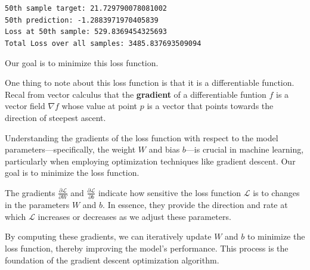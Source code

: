 
\texttt{50th sample target: 21.729790078081002 \\
50th prediction: -1.2883971970405839 \\
Loss at 50th sample: 529.8369454325693 \\
Total Loss over all samples: 3485.837693509094 
}

Our goal is to minimize this loss function. 

One thing to note about this loss function is that it is a differentiable function. Recal from vector calculus that the \textbf{gradient} of a differentiable funtion $f$ is a vector field $\nabla f$ whose value at point $p$ is a vector that points towards the direction of steepest ascent. 

Understanding the gradients of the loss function with respect to the model parameters—specifically, the weight $W$ and bias $b$—is crucial in machine learning, particularly when employing optimization techniques like gradient descent. Our goal is to minimize the loss function. 

The gradients $\frac{\partial \mathcal{L}}{\partial W}$ and $\frac{\partial \mathcal{L}}{\partial b}$ indicate how sensitive the loss function $\mathcal{L}$ is to changes in the parameters $W$ and $b$. In essence, they provide the direction and rate at which $\mathcal{L}$ increases or decreases as we adjust these parameters.

By computing these gradients, we can iteratively update $W$ and $b$ to minimize the loss function, thereby improving the model's performance. This process is the foundation of the gradient descent optimization algorithm.

